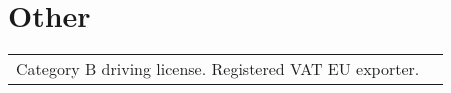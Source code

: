 %
%
%



\section{\texorpdfstring{\color{Blue}Other}{Other}}
\begin{tabular}{rl}
    Category B driving license. Registered VAT EU exporter.\\
\end{tabular}
